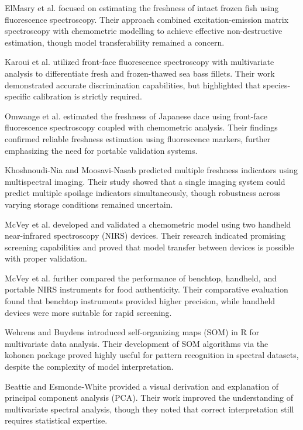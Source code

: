 \documentclass[conference]{IEEEtran}
\begin{document}
ElMasry et al. \cite{ref9} focused on estimating the freshness of intact frozen fish using fluorescence spectroscopy. Their approach combined excitation-emission matrix spectroscopy with chemometric modelling to achieve effective non-destructive estimation, though model transferability remained a concern.

Karoui et al. \cite{ref10} utilized front-face fluorescence spectroscopy with multivariate analysis to differentiate fresh and frozen-thawed sea bass fillets. Their work demonstrated accurate discrimination capabilities, but highlighted that species-specific calibration is strictly required.

Omwange et al. \cite{ref11} estimated the freshness of Japanese dace using front-face fluorescence spectroscopy coupled with chemometric analysis. Their findings confirmed reliable freshness estimation using fluorescence markers, further emphasizing the need for portable validation systems.

Khoshnoudi-Nia and Moosavi-Nasab \cite{ref12} predicted multiple freshness indicators using multispectral imaging. Their study showed that a single imaging system could predict multiple spoilage indicators simultaneously, though robustness across varying storage conditions remained uncertain.

McVey et al. \cite{ref13} developed and validated a chemometric model using two handheld near-infrared spectroscopy (NIRS) devices. Their research indicated promising screening capabilities and proved that model transfer between devices is possible with proper validation.

McVey et al. \cite{ref14} further compared the performance of benchtop, handheld, and portable NIRS instruments for food authenticity. Their comparative evaluation found that benchtop instruments provided higher precision, while handheld devices were more suitable for rapid screening.

Wehrens and Buydens \cite{ref15} introduced self-organizing maps (SOM) in R for multivariate data analysis. Their development of SOM algorithms via the kohonen package proved highly useful for pattern recognition in spectral datasets, despite the complexity of model interpretation.

Beattie and Esmonde-White \cite{ref16} provided a visual derivation and explanation of principal component analysis (PCA). Their work improved the understanding of multivariate spectral analysis, though they noted that correct interpretation still requires statistical expertise.
\end{document}
